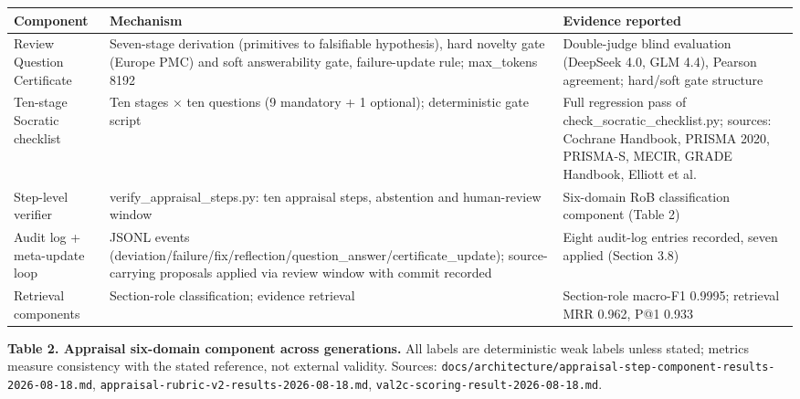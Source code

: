 \documentclass[
]{article}
\newcounter{none} %
\begin{document}
{\def\LTcaptype{none} %
\begin{longtable}[]{@{}
  >{\raggedright\arraybackslash}p{}
  >{\raggedright\arraybackslash}p{}
  >{\raggedright\arraybackslash}p{}@{}}
\toprule\noalign{}
\begin{minipage}[b]{\linewidth}\raggedright
Component
\end{minipage} & \begin{minipage}[b]{\linewidth}\raggedright
Mechanism
\end{minipage} & \begin{minipage}[b]{\linewidth}\raggedright
Evidence reported
\end{minipage} \\
\midrule\noalign{}
\endhead
\bottomrule\noalign{}
\endlastfoot
Review Question Certificate & Seven-stage derivation (primitives to
falsifiable hypothesis), hard novelty gate (Europe PMC) and soft
answerability gate, failure-update rule; max\_tokens 8192 & Double-judge
blind evaluation (DeepSeek 4.0, GLM 4.4), Pearson agreement; hard/soft
gate structure \\
Ten-stage Socratic checklist & Ten stages × ten questions (9 mandatory +
1 optional); deterministic gate script & Full regression pass of
check\_socratic\_checklist.py; sources: Cochrane Handbook, PRISMA 2020,
PRISMA-S, MECIR, GRADE Handbook, Elliott et al. \\
Step-level verifier & verify\_appraisal\_steps.py: ten appraisal steps,
abstention and human-review window & Six-domain RoB classification
component (Table 2) \\
Audit log + meta-update loop & JSONL events
(deviation/failure/fix/reflection/question\_answer/certificate\_update);
source-carrying proposals applied via review window with commit recorded
& Eight audit-log entries recorded, seven applied (Section 3.8) \\
Retrieval components & Section-role classification; evidence retrieval &
Section-role macro-F1 0.9995; retrieval MRR 0.962, P@1 0.933 \\
\end{longtable}
}

\textbf{Table 2. Appraisal six-domain component across generations.} All
labels are deterministic weak labels unless stated; metrics measure
consistency with the stated reference, not external validity. Sources:
\texttt{docs/architecture/appraisal-step-component-results-2026-08-18.md},
\texttt{appraisal-rubric-v2-results-2026-08-18.md},
\texttt{val2c-scoring-result-2026-08-18.md}.
\end{document}
